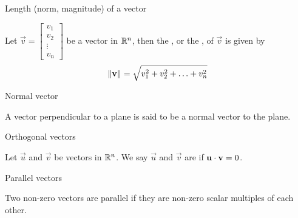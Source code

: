 \documentclass{ximera}
\begin{document}

Length (norm, magnitude) of a vector

\begin{expandable}{}{}
Let $\vec{v}=\begin{bmatrix}v_1\\ v_2\\ \vdots \\v_n\end{bmatrix}$ be a vector in $\mathbb{R}^n$, then the , or the , of $\vec{v}$ is given by
$$  \left\lVert\mathbf{v}\right\rVert=\sqrt{v_1^2+v_2^2+\ldots +v_n^2}$$
\end{expandable}

 
Normal vector

\begin{expandable}{}{}
    A vector perpendicular to a plane is said to be a normal vector to the plane.
\end{expandable}

 
Orthogonal vectors

\begin{expandable}{}{}
Let $\vec{u}$ and $\vec{v}$ be vectors in $\mathbb{R}^n$. We say $\vec{u}$ and $\vec{v}$ are  if $\mathbf{u}\cdot \mathbf{v}=0$.
\end{expandable}

 
Parallel vectors

\begin{expandable}{}{}
    Two non-zero vectors are parallel if they are non-zero scalar multiples of each other.
\end{expandable}
\end{document}
